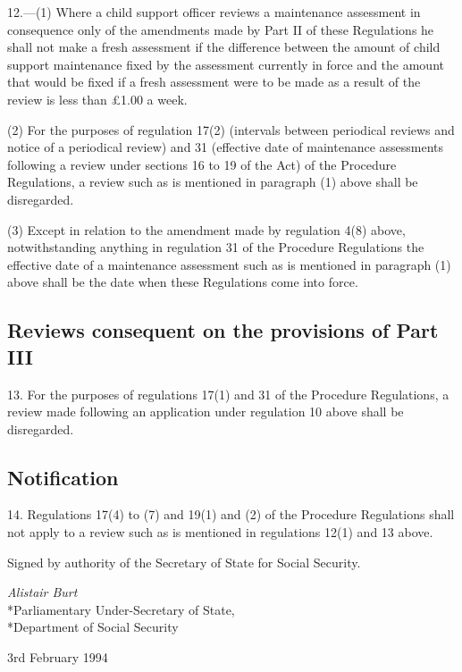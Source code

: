 \documentclass[a4paper]{article}
\begin{document}
12.—(1) Where a child support officer reviews a maintenance assessment in consequence only of the amendments made by Part II of these Regulations he shall not make a fresh assessment if the difference between the amount of child support maintenance fixed by the assessment currently in force and the amount that would be fixed if a fresh assessment were to be made as a result of the review is less than £1.00 a week.

(2) For the purposes of regulation 17(2) (intervals between periodical reviews and notice of a periodical review) and 31 (effective date of maintenance assessments following a review under sections 16 to 19 of the Act) of the Procedure Regulations, a review such as is mentioned in paragraph (1) above shall be disregarded.

(3) Except in relation to the amendment made by regulation 4(8) above, notwithstanding anything in regulation 31 of the Procedure Regulations the effective date of a maintenance assessment such as is mentioned in paragraph (1) above shall be the date when these Regulations come into force.

\subsection[13. Reviews consequent on the provisions of Part III]{Reviews consequent on the provisions of Part III}

13.  For the purposes of regulations 17(1) and 31 of the Procedure Regulations, a review made following an application under regulation 10 above shall be disregarded.

\subsection[14. Notification]{Notification}

14.  Regulations 17(4) to (7) and 19(1) and (2) of the Procedure Regulations shall not apply to a review such as is mentioned in regulations 12(1) and 13 above.

\bigskip

Signed by authority of the Secretary of State for Social Security.

{\raggedleft
\emph{Alistair Burt}\\*Parliamentary Under-Secretary of State,\\*Department of Social Security

}

3rd February 1994
\end{document}
